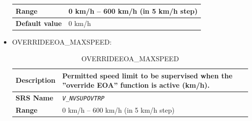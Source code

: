 \documentclass{template/openetcs}
\begin{document}
\begin{itemize}
\begin{longtable}{|l|l|}
					\begin{minipage}[t]{0.22\linewidth} \textbf{Range}	\end{minipage} 
				&	\begin{minipage}[t]{0.78\linewidth} 0 km/h – 600 km/h (in 5 km/h step) \end{minipage} \\
								
				\hline
										
					\begin{minipage}[t]{0.22\linewidth} \textbf{Default value}	\end{minipage} 
				&	\begin{minipage}[t]{0.78\linewidth} 0 km/h \end{minipage} \\
				
				\hline
				
			\end{longtable}
			
		\item OVERRIDEEOA\_MAXSPEED:
		
			\begin{longtable}{|l|l|}
				\caption{OVERRIDEEOA\_MAXSPEED}\\ 																				
				\hline
				
					\begin{minipage}[t]{0.22\linewidth} \textbf{Description}	\end{minipage} 
				&	\begin{minipage}[t]{0.78\linewidth} Permitted speed limit to be supervised when the ”override EOA” function is active (km/h). \end{minipage} \\
				
				\hline
				
					\begin{minipage}[t]{0.22\linewidth} \textbf{SRS Name}	\end{minipage} 
				&	\begin{minipage}[t]{0.78\linewidth} \emph{\texttt{V\_NVSUPOVTRP}} \end{minipage} \\
				
				\hline
																																
					\begin{minipage}[t]{0.22\linewidth} \textbf{Range}	\end{minipage} 
				&	\begin{minipage}[t]{0.78\linewidth} 0 km/h – 600 km/h (in 5 km/h step) \end{minipage} \\
								

\end{longtable}
\end{itemize}
\end{document}

